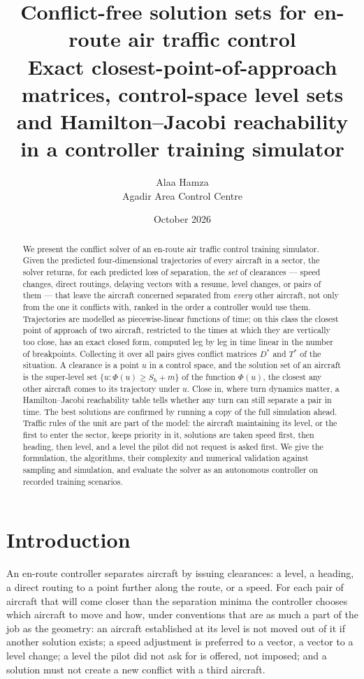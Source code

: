 \documentclass[11pt,a4paper]{article}
\title{\textbf{Conflict-free solution sets for en-route air traffic control}\\[4pt]
\large Exact closest-point-of-approach matrices, control-space level sets\\ and Hamilton--Jacobi reachability in a controller training simulator}
\author{Alaa Hamza\\ \small Agadir Area Control Centre}
\date{\small October 2026}
\newcommand{\Sh}{S_h}
\begin{document}
\maketitle

\begin{abstract}
\noindent
We present the conflict solver of an en-route air traffic control training simulator. Given the predicted
four-dimensional trajectories of every aircraft in a sector, the solver returns, for each predicted loss of
separation, the \emph{set} of clearances --- speed changes, direct routings, delaying vectors with a resume, level
changes, or pairs of them --- that leave the aircraft concerned separated from \emph{every} other aircraft, not only
from the one it conflicts with, ranked in the order a controller would use them. Trajectories are modelled as
piecewise-linear functions of time; on this class the closest point of approach of two aircraft, restricted to the
times at which they are vertically too close, has an exact closed form, computed leg by leg in time linear in the
number of breakpoints. Collecting it over all pairs gives conflict matrices $D^*$ and $T^*$ of the situation. A
clearance is a point $u$ in a control space, and the solution set of an aircraft is the super-level set
$\{u : \Phi(u) \ge \Sh + m\}$ of the function $\Phi(u)$, the closest any other aircraft comes to its trajectory under
$u$. Close in, where turn dynamics matter, a Hamilton--Jacobi reachability table tells whether any turn can still
separate a pair in time. The best solutions are confirmed by running a copy of the full simulation ahead. Traffic
rules of the unit are part of the model: the aircraft maintaining its level, or the first to enter the sector, keeps
priority in it, solutions are taken speed first, then heading, then level, and a level the pilot did not request is
asked first. We give the formulation, the algorithms, their complexity and numerical validation against sampling and
simulation, and evaluate the solver as an autonomous controller on recorded training scenarios.
\end{abstract}

\section{Introduction}

An en-route controller separates aircraft by issuing clearances: a level, a heading, a direct routing to a point
further along the route, or a speed. For each pair of aircraft that will come closer than the separation minima the
controller chooses which aircraft to move and how, under conventions that are as much a part of the job as the
geometry: an aircraft established at its level is not moved out of it if another solution exists; a speed
adjustment is preferred to a vector, a vector to a level change; a level the pilot did not ask for is offered, not
imposed; and a solution must not create a new conflict with a third aircraft.
\end{document}
